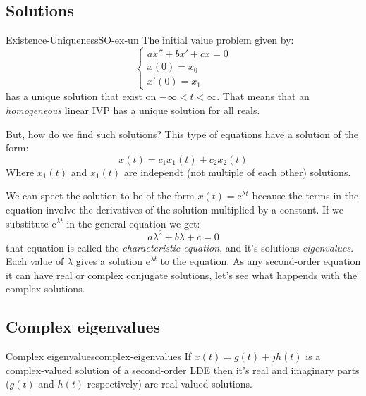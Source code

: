 \documentclass[../ode.tex]{subfiles}
\begin{document}
    \subsection{\sffamily Solutions}
    
    \begin{thm}{Existence-Uniqueness}{SO-ex-un}
        The initial value problem given by:
        \begin{equation*}
            \begin{cases}
                ax''+bx'+cx = 0\\
                x(0) = x_0\\
                x'(0) = x_1
            \end{cases}
        \end{equation*}        
        has a unique solution that exist on $-\infty<t<\infty$. That means that an \emph{homogeneous} linear IVP has a unique
        solution for all reals.
    \end{thm}

    But, how do we find such solutions? This type of equations have a solution of the form:
    \begin{equation*}
        x(t) =c_1 x_1(t) + c_2 x_2(t)
    \end{equation*}
    Where $x_1(t)$ and $x_1(t)$ are independt (not multiple of each other) solutions.

    We can spect the solution to be of the form $x(t)=\mathrm{e}^{\lambda t} $ because the
    terms in the equation involve the derivatives of the solution multiplied by a constant. If we substitute $\mathrm{e}^{\lambda
    t} $ in the general equation we get:
    \begin{equation*}
        a\lambda^{2} + b\lambda + c =0 
    \end{equation*}
    that equation is called the \emph{characteristic equation}, and it's solutions \emph{eigenvalues}. Each value of $\lambda$
    gives a solution $\mathrm{e}^{\lambda t} $ to the equation. As any second-order equation it can have real or complex conjugate
    solutions, let's see what happends with the complex solutions.

    \subsection{\sffamily Complex eigenvalues}

    \begin{thm}{Complex eigenvalues}{complex-eigenvalues}
        If $x(t) = g(t) + j h(t)$ is a complex-valued solution of a second-order LDE then it's real and imaginary parts ($g(t)$
        and $h(t)$ respectively) are real valued solutions.
    \end{thm}
     
\end{document}
